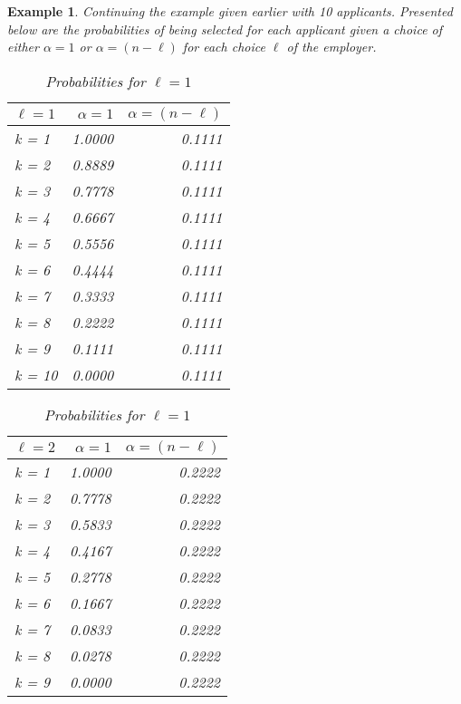 \documentclass{article}
\newtheorem{example}{Example} %
\begin{document}
\begin{example}
\label{example:applicant_probabilities}
Continuing the example given earlier with 10 applicants. Presented below are the probabilities of being selected for each applicant given a choice of either $\alpha = 1$ or $\alpha = (n-\ell)$ for each choice $\ell$ of the employer.

\begin{table}[H]\label{tab:table1}
\centering
\begin{minipage}{0.33\textwidth}

\small
\begin{tabular}{lrr}
\hline
$\ell=1$ & $\alpha = 1$ & $\alpha = (n-\ell)$ \\
\hline
k = 1  &     1.0000 &         0.1111 \\
k = 2  &     0.8889 &         0.1111 \\
k = 3  &     0.7778 &         0.1111 \\
k = 4  &     0.6667 &         0.1111 \\
k = 5  &     0.5556 &         0.1111 \\
k = 6  &     0.4444 &         0.1111 \\
k = 7  &     0.3333 &         0.1111 \\
k = 8  &     0.2222 &         0.1111 \\
k = 9  &     0.1111 &         0.1111 \\
k = 10 &     0.0000 &         0.1111 \\
\hline
\end{tabular}
\caption{Probabilities for $\ell=1$}
\end{minipage}\hfill
\centering
\begin{minipage}{0.33\textwidth}
\small
\begin{tabular}{lrr}
\hline
$\ell=2$ & $\alpha = 1$ & $\alpha = (n-\ell)$ \\
\hline
k = 1  &     1.0000 &         0.2222 \\
k = 2  &     0.7778 &         0.2222 \\
k = 3  &     0.5833 &         0.2222 \\
k = 4  &     0.4167 &         0.2222 \\
k = 5  &     0.2778 &         0.2222 \\
k = 6  &     0.1667 &         0.2222 \\
k = 7  &     0.0833 &         0.2222 \\
k = 8  &     0.0278 &         0.2222 \\
k = 9  &     0.0000 &         0.2222 \\

\end{tabular}
\end{minipage}
\end{table}
\end{example}
\end{document}
